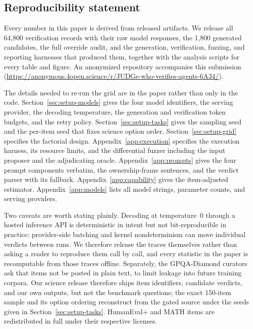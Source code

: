 \subsection*{Reproducibility statement}

Every number in this paper is derived from released artifacts. We release all 64{,}800
verification records with their raw model responses, the 1{,}800 generated candidates, the
full override audit, and the generation, verification, fuzzing, and reporting harnesses that
produced them, together with the analysis scripts for every table and figure. An anonymized
repository accompanies this submission (\url{https://anonymous.4open.science/r/JUDGe-who-verifies-agents-6A34/}).

The details needed to re-run the grid are in the paper rather than only in the code.
Section~\ref{sec:setup-models} gives the four model identifiers, the serving provider, the
decoding temperature, the generation and verification token budgets, and the retry policy.
Section~\ref{sec:setup-tasks} gives the sampling seed and the per-item seed that fixes
science option order. Section~\ref{sec:setup-grid} specifies the factorial design.
Appendix~\ref{app:execution} specifies the execution harness, its resource limits, and the
differential fuzzer including the input proposer and the adjudicating oracle.
Appendix~\ref{app:prompts} gives the four prompt components verbatim, the ownership-frame
sentences, and the verdict parser with its fallback. Appendix~\ref{app:capability} gives the
item-adjusted estimator. Appendix~\ref{app:models} lists all model strings, parameter counts,
and serving providers.

Two caveats are worth stating plainly. Decoding at temperature~0 through a hosted inference
API is deterministic in intent but not bit-reproducible in practice: provider-side batching
and kernel nondeterminism can move individual verdicts between runs. We therefore release
the traces themselves rather than asking a reader to reproduce them call by call, and every
statistic in the paper is recomputable from those traces offline. Separately, the
GPQA-Diamond curators ask that items not be posted in plain text, to limit leakage into
future training corpora. Our science release therefore ships item identifiers, candidate
verdicts, and our own outputs, but not the benchmark questions; the exact 150-item sample
and its option ordering reconstruct from the gated source under the seeds given in
Section~\ref{sec:setup-tasks}. HumanEval+ and MATH items are redistributed in full under
their respective licenses.
